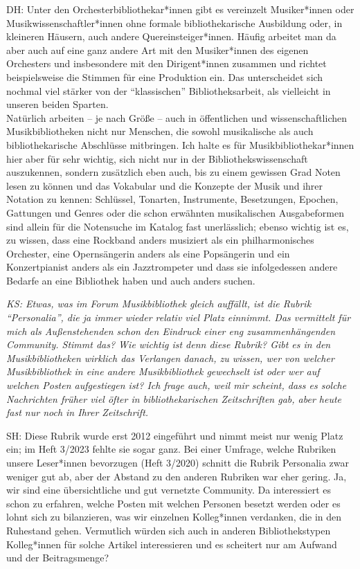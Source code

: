 \documentclass[a4paper,
fontsize=11pt,
oneside,
numbers=noperiodatend,
parskip=half-,
bibliography=totoc,
final
]{scrartcl}
\begin{document}
DH: Unter den Orchesterbibliothekar*innen gibt es vereinzelt
Musiker*innen oder Musikwissenschaftler*innen ohne formale
bibliothekarische Ausbildung oder, in kleineren Häusern, auch andere
Quereinsteiger*innen. Häufig arbeitet man da aber auch auf eine ganz
andere Art mit den Musiker*innen des eigenen Orchesters und insbesondere
mit den Dirigent*innen zusammen und richtet beispielsweise die Stimmen
für eine Produktion ein. Das unterscheidet sich nochmal viel stärker von
der \enquote{klassischen} Bibliotheksarbeit, als vielleicht in unseren
beiden Sparten.\\
Natürlich arbeiten -- je nach Größe -- auch in öffentlichen und
wissenschaftlichen Musikbibliotheken nicht nur Menschen, die sowohl
musikalische als auch bibliothekarische Abschlüsse mitbringen. Ich halte
es für Musikbibliothekar*innen hier aber für sehr wichtig, sich nicht
nur in der Bibliothekswissenschaft auszukennen, sondern zusätzlich eben
auch, bis zu einem gewissen Grad Noten lesen zu können und das Vokabular
und die Konzepte der Musik und ihrer Notation zu kennen: Schlüssel,
Tonarten, Instrumente, Besetzungen, Epochen, Gattungen und Genres oder
die schon erwähnten musikalischen Ausgabeformen sind allein für die
Notensuche im Katalog fast unerlässlich; ebenso wichtig ist es, zu
wissen, dass eine Rockband anders musiziert als ein philharmonisches
Orchester, eine Opernsängerin anders als eine Popsängerin und ein
Konzertpianist anders als ein Jazztrompeter und dass sie infolgedessen
andere Bedarfe an eine Bibliothek haben und auch anders suchen.

\emph{KS: Etwas, was im Forum Musikbibliothek gleich auffällt, ist die
Rubrik \enquote{Personalia}, die ja immer wieder relativ viel Platz
einnimmt. Das vermittelt für mich als Außenstehenden schon den Eindruck
einer eng zusammenhängenden Community. Stimmt das? Wie wichtig ist denn
diese Rubrik? Gibt es in den Musikbibliotheken wirklich das Verlangen
danach, zu wissen, wer von welcher Musikbibliothek in eine andere
Musikbibliothek gewechselt ist oder wer auf welchen Posten aufgestiegen
ist? Ich frage auch, weil mir scheint, dass es solche Nachrichten früher
viel öfter in bibliothekarischen Zeitschriften gab, aber heute fast nur
noch in Ihrer Zeitschrift.}

SH: Diese Rubrik wurde erst 2012 eingeführt und nimmt meist nur wenig
Platz ein; im Heft 3/2023 fehlte sie sogar ganz. Bei einer Umfrage,
welche Rubriken unsere Leser*innen bevorzugen (Heft 3/2020) schnitt die
Rubrik Personalia zwar weniger gut ab, aber der Abstand zu den anderen
Rubriken war eher gering. Ja, wir sind eine übersichtliche und gut
vernetzte Community. Da interessiert es schon zu erfahren, welche Posten
mit welchen Personen besetzt werden oder es lohnt sich zu bilanzieren,
was wir einzelnen Kolleg*innen verdanken, die in den Ruhestand gehen.
Vermutlich würden sich auch in anderen Bibliothekstypen Kolleg*innen für
solche Artikel interessieren und es scheitert nur am Aufwand und der
Beitragsmenge?
\end{document}
